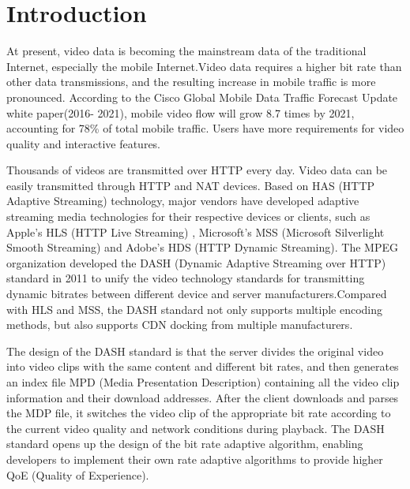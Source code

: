 \documentclass[twocolumn]{article}
\begin{document}
\saythanks

\setlength{\baselineskip}{12pt plus.2pt}

\section{Introduction}
At present, video data is becoming the mainstream data of the traditional Internet, 
especially the mobile Internet.Video data requires a higher bit rate than other 
data transmissions, and the resulting increase in mobile traffic is more pronounced.
According to the Cisco Global Mobile Data Traffic Forecast Update white paper(2016- 2021)\cite{RN1}, 
mobile video flow will grow 8.7 times by 2021, accounting for 78\% of total mobile traffic.
Users have more requirements for video quality and interactive features.

Thousands of videos are transmitted over HTTP every day.
Video data can be easily transmitted through HTTP and NAT devices.
Based on HAS (HTTP Adaptive Streaming) technology, major vendors have developed adaptive 
streaming media technologies for their respective devices or clients, such as 
Apple's HLS (HTTP Live Streaming) , Microsoft's MSS (Microsoft Silverlight Smooth Streaming) 
and Adobe's HDS (HTTP Dynamic Streaming).
The MPEG organization developed the DASH (Dynamic Adaptive Streaming over HTTP) standard 
in 2011 to unify the video technology standards for transmitting dynamic bitrates between 
different device and server manufacturers\cite{RN2}.Compared with HLS and MSS, 
the DASH standard not only supports multiple encoding methods, 
but also supports CDN docking from multiple manufacturers.

The design of the DASH standard is that the server divides the original video 
into video clips with the same content and 
different bit rates, and then generates an index file MPD (Media Presentation Description) 
containing all the video clip information and their download addresses.
After the client downloads and parses the MDP file, it switches the 
video clip of the appropriate bit rate according to the current video 
quality and network conditions during playback\cite{RN3}.
The DASH standard opens up the design of the bit rate adaptive algorithm, 
enabling developers to implement their own rate adaptive algorithms to 
provide higher QoE (Quality of Experience).
\end{document}
